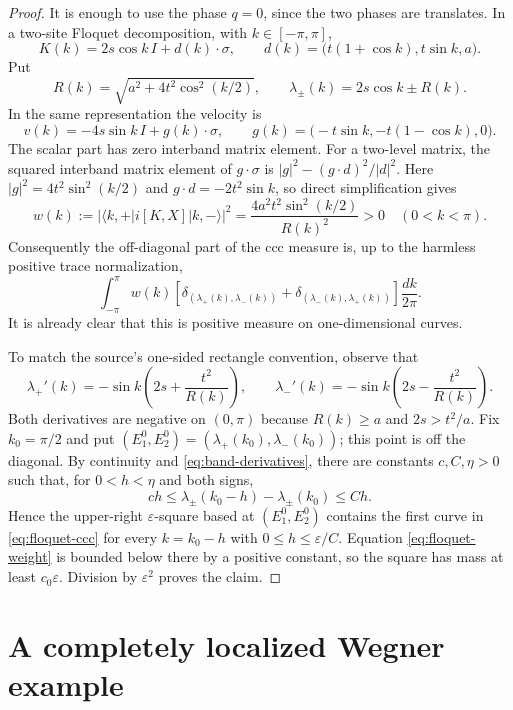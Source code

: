 \documentclass[10pt]{article}
\begin{document}
\begin{proof}
It is enough to use the phase $q=0$, since the two phases are translates. In a
two-site Floquet decomposition, with $k\in[-\pi,\pi]$,
\[
 K(k)=2s\cos k\,I+d(k)\cdot\sigma,
 \qquad d(k)=\bigl(t(1+\cos k),t\sin k,a\bigr).
\]
Put
\[
 R(k)=\sqrt{a^2+4t^2\cos^2(k/2)},\qquad
 \lambda_\pm(k)=2s\cos k\pm R(k).
\]
In the same representation the velocity is
\[
 v(k)=-4s\sin k\,I+g(k)\cdot\sigma,
 \qquad g(k)=\bigl(-t\sin k,-t(1-\cos k),0\bigr).
\]
The scalar part has zero interband matrix element. For a two-level matrix,
the squared interband matrix element of $g\cdot\sigma$ is
$|g|^2-(g\cdot d)^2/|d|^2$. Here
$|g|^2=4t^2\sin^2(k/2)$ and $g\cdot d=-2t^2\sin k$, so direct simplification
gives
\begin{equation}\label{eq:floquet-weight}
 w(k):=|\langle k,+|i[K,X]|k,-\rangle|^2
 =\frac{4a^2t^2\sin^2(k/2)}{R(k)^2}>0
 \quad(0<k<\pi).
\end{equation}
Consequently the off-diagonal part of the ccc measure is, up to the harmless
positive trace normalization,
\begin{equation}\label{eq:floquet-ccc}
 \int_{-\pi}^{\pi}w(k)
 \left[\delta_{(\lambda_+(k),\lambda_-(k))}
       +\delta_{(\lambda_-(k),\lambda_+(k))}\right]\frac{dk}{2\pi}.
\end{equation}
It is already clear that this is positive measure on one-dimensional curves.

To match the source's one-sided rectangle convention, observe that
\begin{equation}\label{eq:band-derivatives}
 \lambda_+'(k)=-\sin k\left(2s+\frac{t^2}{R(k)}\right),\qquad
 \lambda_-'(k)=-\sin k\left(2s-\frac{t^2}{R(k)}\right).
\end{equation}
Both derivatives are negative on $(0,\pi)$ because $R(k)\ge a$ and
$2s>t^2/a$. Fix $k_0=\pi/2$ and put
$(E_1^0,E_2^0)=(\lambda_+(k_0),\lambda_-(k_0))$; this point is off the
diagonal. By continuity and \eqref{eq:band-derivatives}, there are constants
$c,C,\eta>0$ such that, for $0<h<\eta$ and both signs,
\[
 ch\le\lambda_\pm(k_0-h)-\lambda_\pm(k_0)\le Ch.
\]
Hence the upper-right $\varepsilon$-square based at
$(E_1^0,E_2^0)$ contains the first curve in \eqref{eq:floquet-ccc} for every
$k=k_0-h$ with $0\le h\le\varepsilon/C$. Equation
\eqref{eq:floquet-weight} is bounded below there by a positive constant, so
the square has mass at least $c_0\varepsilon$. Division by
$\varepsilon^2$ proves the claim.
\end{proof}

\section{A completely localized Wegner example}
\end{document}
